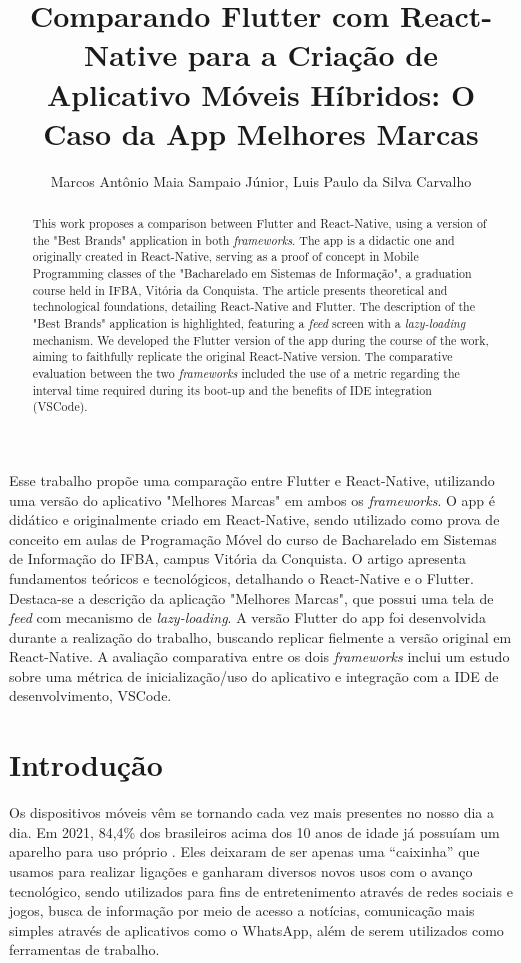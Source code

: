\documentclass[12pt]{article}
\title{Comparando Flutter com React-Native para a Criação de Aplicativo Móveis Híbridos: O Caso da App Melhores Marcas}
\author{Marcos Antônio Maia Sampaio Júnior\inst{1}, Luis Paulo da Silva Carvalho\inst{1}}
\begin{document}
 

\maketitle

\begin{abstract}
This work proposes a comparison between Flutter and React-Native, using a version of the "Best Brands" application in both \textit{frameworks}. The app is a didactic one and originally created in React-Native, serving as a proof of concept in Mobile Programming classes of the "Bacharelado em Sistemas de Informação", a graduation course held in IFBA, Vitória da Conquista. The article presents theoretical and technological foundations, detailing React-Native and Flutter. The description of the "Best Brands" application is highlighted, featuring a \textit{feed} screen with a \textit{lazy-loading} mechanism. We developed the Flutter version of the app during the course of the work, aiming to faithfully replicate the original React-Native version. The comparative evaluation between the two \textit{frameworks} included the use of a metric regarding the interval time required during its boot-up and the benefits of IDE integration (VSCode).
\end{abstract}
     
\begin{resumo} 
Esse trabalho propõe uma comparação entre Flutter e React-Native, utilizando uma versão do aplicativo "Melhores Marcas" em ambos os \textit{frameworks}. O app é didático e originalmente criado em React-Native, sendo utilizado como prova de conceito em aulas de Programação Móvel do curso de Bacharelado em Sistemas de Informação do IFBA, campus Vitória da Conquista. O artigo apresenta fundamentos teóricos e tecnológicos, detalhando o React-Native e o Flutter. Destaca-se a descrição da aplicação "Melhores Marcas", que possui uma tela de \textit{feed} com mecanismo de \textit{lazy-loading}. A versão Flutter do app foi desenvolvida durante a realização do trabalho, buscando replicar fielmente a versão original em React-Native. A avaliação comparativa entre os dois \textit{frameworks} inclui um estudo sobre uma métrica de inicialização/uso do aplicativo e integração com a IDE de desenvolvimento, VSCode.
\end{resumo}

\section{Introdução}
Os dispositivos móveis vêm se tornando cada vez mais presentes no nosso dia a dia. Em 2021, 84,4\% dos brasileiros acima dos 10 anos de idade já possuíam um aparelho para uso próprio \cite{ref_2}. Eles deixaram de ser apenas uma “caixinha” que usamos para realizar ligações e ganharam diversos novos usos com o avanço tecnológico, sendo utilizados para fins de entretenimento através de redes sociais e jogos, busca de informação por meio de acesso a notícias, comunicação mais simples através de aplicativos como o WhatsApp, além de serem utilizados como ferramentas de trabalho.
\end{document}
